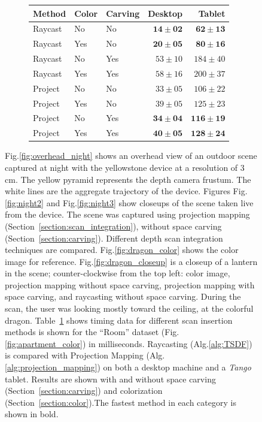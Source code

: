 \documentclass[10pt,twocolumn,letterpaper]{article}
\newcommand{\sref}[1]{Section~\ref{#1}}
\newcommand{\figref}[1]{Fig.\ref{#1}}
\newcommand{\tabref}[1]{Table~\ref{#1}}
\newcommand{\algoref}[1]{Alg.\ref{#1}}
\begin{document}
\begin{figure} [htb]
\begin{subfigure}{0.35\linewidth}
\begin{tabular} { | l | l | l | r | r |}
			\hline
			Method       & Color & Carving & Desktop& Tablet\\
			\hline 
			Raycast & No& No&$\mathbf{14 \pm 02}$ & $\mathbf{62 \pm 13}$ \\ \hline
			Raycast & Yes & No& $\mathbf{20 \pm 05}$ & $\mathbf{80 \pm 16}$ \\ \hline
			Raycast & No & Yes & $53 \pm  10$ & $184 \pm 40$ \\ \hline
			Raycast & Yes & Yes &$58 \pm 16$  & $200 \pm 37$\\ \hline \hline
			Project & No & No & $33 \pm 05$ & $106 \pm 22$ \\ \hline
			Project & Yes & No & $39 \pm 05$  & $125 \pm 23$ \\ \hline
			Project  & No & Yes & $\mathbf{34 \pm 04}$  & $\mathbf{116 \pm 19}$ \\ \hline
			Project & Yes & Yes  & $\mathbf{40 \pm 05}$ & $\mathbf{128 \pm 24}$ \\ \hline
			\end{tabular}
			\caption{}
			\label{table:timing}
	 \end{subfigure} 
	 \caption{\figref{fig:overhead_night} shows an overhead view of
	 an outdoor scene captured at night with the yellowstone device at a
	 resolution of 3 cm. The yellow pyramid represents the depth camera frustum. The white
	 lines are the aggregate trajectory of the device. Figures \figref{fig:night2}
	 and \figref{fig:night3} show closeups of the scene taken live from the device.
	 The scene was captured using projection mapping
	 (\sref{section:scan_integration}), without space carving 
	 (\sref{section:carving}). Different depth scan integration techniques are
	compared. \figref{fig:dragon_color} shows the color image for reference. 
	\figref{fig:dragon_closeup} is a closeup of a lantern in the scene; 
	 counter-clockwise from the top left: color image, projection mapping without
	 space carving, projection mapping with space carving, and raycasting without
	 space carving. During the scan, the user was looking mostly toward the
	 ceiling, at the colorful dragon. \tabref{table:timing} shows timing data
	 for different scan insertion methods is shown for the ``Room'' dataset (\figref{fig:apartment_color}) in milliseconds. Raycasting
			(\algoref{alg:TSDF}) is compared with Projection Mapping 
			(\algoref{alg:projection_mapping}) on both a desktop machine and a
			\textit{Tango} tablet. Results are shown with and without space carving (\sref{section:carving}) and colorization (\sref{section:color}).The fastest
			method in each category is shown in bold.}
	 \label{fig:device_data}
 \end{figure} 
\end{document}
